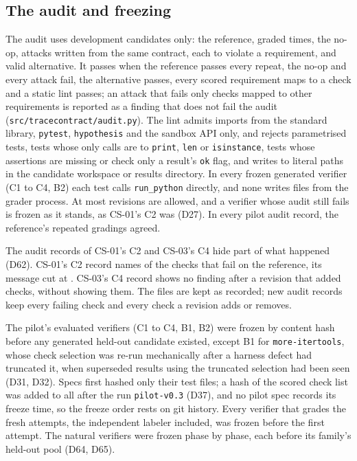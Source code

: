 \subsection{The audit and freezing}
\label{sec:audit}\label{sec:freezing}
The audit uses development candidates only: the reference, graded  times, the
no-op,  attacks written from the same contract, each to violate a requirement, and
 valid alternative. It passes when the reference passes every repeat, the no-op and every
attack fail, the alternative passes, every scored requirement maps to a check and a static lint passes; an attack that
fails only checks mapped to other requirements is reported as a finding that does not fail the audit
(\texttt{src/tracecontract/audit.py}). The lint admits imports from the standard library, \texttt{pytest},
\texttt{hypothesis} and the sandbox API only, and rejects parametrised tests, tests whose only calls are to
\texttt{print}, \texttt{len} or \texttt{isinstance}, tests whose assertions are missing or check only a result's
\texttt{ok} flag, and writes to literal paths in the candidate workspace or results directory. In every frozen generated
verifier (C1 to C4, B2) each test calls \texttt{run\_python} directly, and none writes files from the grader process. At
most  revisions are allowed, and a verifier whose audit still fails is frozen as it stands,
as CS-01's C2 was (D27). In every pilot audit record, the reference's repeated gradings agreed.

The audit records of CS-01's C2 and CS-03's C4 hide part of what happened (D62). CS-01's C2 record names
 of the  checks that fail on the reference, its message cut at
. CS-03's C4 record shows no finding after a revision that added  checks,
without showing them. The files are kept as recorded; new audit records keep every failing check and every check a
revision adds or removes.

The pilot's evaluated verifiers (C1 to C4, B1, B2) were frozen by content hash before any generated held-out candidate
existed, except B1 for \texttt{more-itertools}, whose check selection was re-run mechanically after a harness defect had
truncated it, when superseded results using the truncated selection had been seen (D31, D32). Specs first hashed only
their test files; a hash of the scored check list was added to all  after the run
\texttt{pilot-v0.3} (D37), and no pilot spec records its freeze time, so the freeze order rests on git history. Every
verifier that grades the fresh attempts, the independent labeler included, was frozen before the first attempt. The
natural verifiers were frozen phase by phase, each before its family's held-out pool (D64, D65).


